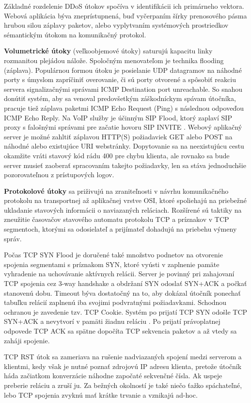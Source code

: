 \documentclass[12pt, a4paper]{article}
\begin{document}
Základné rozdelenie DDoS útokov spočíva v identifikácii ich primárneho vektora. Webová aplikácia
býva zneprístupnená, buď vyčerpaním šírky prenosového pásma hrubou silou záplavy paketov, alebo
vyplytvaním systémových prostriedkov sémantickým útokom na komunikačný protokol.

\textbf{Volumetrické útoky} (veľkoobjemové útoky) saturujú kapacitu linky rozmanitou plejádou nálože. 
Spoločným menovateľom je technika flooding (záplava). Populárnou formou útoku je posielanie UDP datagramov 
na náhodné porty s úmyslom zapríčiniť overovanie, či sú porty otvorené a spôsobiť reakciu 
servera signalizačnými správami ICMP Destination port unreachable. So snahou donútiť systém, aby sa venoval 
predovšetkým záškodníckym spávam útočníka, pracuje tiež záplava paketmi ICMP Echo Request (Ping) 
s následnou odpoveďou ICMP Echo Reply. Na VoIP služby je účinným SIP Flood, ktorý zaplaví SIP proxy s
falošnými správami pre začatie hovoru SIP INVITE \cite{botnets}. Webový aplikačný server je možné zahltiť 
záplavou HTTP(S) požiadaviek GET alebo POST na náhodné alebo existujúce URI webstránky. Dopytovanie sa na 
neexistujúcu cestu okamžite vráti stavový kód rádu 400 pre  chybu klienta, ale rovnako sa bude server 
musieť zaoberať spracovaním takejto požiadavky, len sa stáva jednoduchšie pozorovateľnou z prístupových 
logov. 

\textbf{Protokolové útoky} sa priživujú na zraniteľnosti v návrhu komunikačného protokolu na transportnej
až aplikačnej vrstve OSI, ktoré spoliehajú na priebežné ukladanie stavových informácii o naviazaných
reláciach. Rozšírené sú taktiky na zneužitie časovačov stavového automatu protokolu TCP a príznakov v TCP 
segmentoch, ktorými sa odosielateľ a prijímateľ dohadujú na priebehu výmeny správ. 

Počas TCP SYN Flood je doručené také množstvo podnetov na otvorenie spojenia segmentami s príznakom SYN, 
ktoré vyústi v zaplnenie pamäte vyhradenie na uchovávanie aktívnych relácii. Server je povinný pri 
zahajovaní TCP spojenia cez 3-way handshake a obdržaní SYN odoslať SYN+ACK a počkať stanovenú dobu. Timeout 
býva dostatočný na to, aby dokázal útočník ponechať tabuľku relácií zaplnenú iba svojimi podvratnými 
požiadavkami. Schodnou ochranou je zavedenie tzv. TCP Cookie. Systém po prijatí TCP SYN odošle TCP SYN+ACK a 
nevytvorí v pamäti žiadnu reláciu \cite{csirt-ddos}. Po prijatí právoplatnej odpovede TCP ACK sa spätne 
dopočíta TCP sekvencia paketov a až vtedy sa zaháji spojenie. 

TCP RST útok sa zameriava na rušenie nadviazaných spojení medzi serverom a klientmi, kedy však je
nutné poznať zdrojovú IP adresu klienta, pretože útočník háda začiatkom konverzácie náhodne započaté 
sekvenčné čísla. Ak uspeje preberie reláciu a zruší ju. Za bežných okolností je také niečo ťažko 
spáchateľné, lebo TCP spojenia zvyknú mať krátke trvanie a vznikajú ad-hoc.
\end{document}
